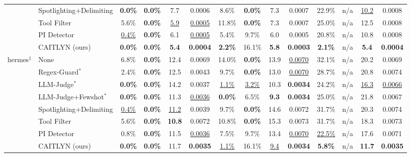 \begin{table}[!t]
\begin{tabular}{@{}ll*{3}{cccc}@{}}
      & Spotlighting+Delimiting \cite{agentdojo} & \textbf{0.0\%} & \textbf{0.0\%} & 7.7 & 0.0006 & 8.6\% & \textbf{0.0\%} & 7.3 & 0.0007 & 22.9\% & n/a & \underline{10.2} & 0.0008 \\
      & Tool Filter \cite{agentdojo} & 5.6\% & \textbf{0.0\%} & \underline{5.9} & \underline{0.0005} & 11.8\% & \textbf{0.0\%} & 7.3 & 0.0007 & 25.0\% & n/a & 12.5 & 0.0008 \\
      & PI Detector \cite{agentdojo,protectaideberta} & \underline{0.4\%} & \textbf{0.0\%} & 6.1 & \underline{0.0005} & 5.4\% & 9.7\% & 6.0 & 0.0005 & 20.8\% & n/a & 10.8 & 0.0008 \\
      \rowcolor{BoxGray} & CAITLYN (ours) & \textbf{0.0\%} & \textbf{0.0\%} & \textbf{5.4} & \textbf{0.0004} & \textbf{2.2\%} & 16.1\% & \textbf{5.8} & \textbf{0.0003} & \textbf{2.1\%} & n/a & \textbf{5.4} & \textbf{0.0004} \\
    \midrule
    \multirow{8}{*}{hermes\(^\ddagger\)}
      & None & 6.8\% & \textbf{0.0\%} & 12.4 & 0.0069 & 14.0\% & \textbf{0.0\%} & 13.9 & \underline{0.0070} & 32.1\% & n/a & 20.2 & 0.0069 \\
      & Regex-Guard\(^{*}\) & 2.4\% & \textbf{0.0\%} & 12.5 & 0.0043 & 9.7\% & \textbf{0.0\%} & 13.0 & \underline{0.0070} & 28.7\% & n/a & 20.8 & 0.0074 \\
      & LLM-Judge\(^{*}\) & \textbf{0.0\%} & \textbf{0.0\%} & 14.2 & 0.0037 & \underline{1.1\%} & \underline{3.2\%} & 10.3 & \textbf{0.0034} & 24.2\% & n/a & \underline{16.3} & \underline{0.0066} \\
      & LLM-Judge+Fewshot\(^{*}\) & \textbf{0.0\%} & \textbf{0.0\%} & 11.3 & \underline{0.0036} & \textbf{0.0\%} & 6.5\% & \textbf{9.3} & \textbf{0.0034} & 25.0\% & n/a & 21.8 & 0.0067 \\
      & Spotlighting+Delimiting \cite{agentdojo} & \underline{0.4\%} & \textbf{0.0\%} & \underline{11.2} & 0.0039 & 9.7\% & \textbf{0.0\%} & 14.6 & 0.0072 & 31.7\% & n/a & 20.3 & 0.0074 \\
      & Tool Filter \cite{agentdojo} & 5.6\% & \textbf{0.0\%} & \textbf{10.8} & 0.0072 & 10.8\% & \textbf{0.0\%} & 15.3 & 0.0073 & 31.7\% & n/a & 18.3 & 0.0073 \\
      & PI Detector \cite{agentdojo,protectaideberta} & 0.8\% & \textbf{0.0\%} & 11.5 & \underline{0.0036} & 7.5\% & 9.7\% & 13.4 & \underline{0.0070} & \underline{22.5\%} & n/a & 17.6 & 0.0071 \\
      \rowcolor{BoxGray} & CAITLYN (ours) & \textbf{0.0\%} & \textbf{0.0\%} & 11.7 & \textbf{0.0035} & \underline{1.1\%} & 16.1\% & \underline{9.4} & \textbf{0.0034} & \textbf{5.8\%} & n/a & \textbf{11.7} & \textbf{0.0035} \\

\end{tabular}
\end{table}
